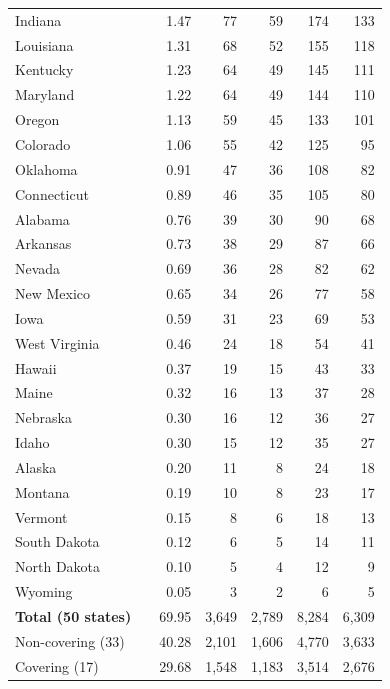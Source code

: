 \begin{landscape}
\begin{longtable}{@{} l l r r r r r @{}}
  Indiana &  & 1.47 & 77 & 59 & 174 & 133 \\
  Louisiana &  & 1.31 & 68 & 52 & 155 & 118 \\
  Kentucky &  & 1.23 & 64 & 49 & 145 & 111 \\
  Maryland &  & 1.22 & 64 & 49 & 144 & 110 \\
  Oregon &  & 1.13 & 59 & 45 & 133 & 101 \\
  Colorado &  & 1.06 & 55 & 42 & 125 & 95 \\
  Oklahoma &  & 0.91 & 47 & 36 & 108 & 82 \\
  Connecticut &  & 0.89 & 46 & 35 & 105 & 80 \\
  Alabama &  & 0.76 & 39 & 30 & 90 & 68 \\
  Arkansas &  & 0.73 & 38 & 29 & 87 & 66 \\
  Nevada &  & 0.69 & 36 & 28 & 82 & 62 \\
  New Mexico &  & 0.65 & 34 & 26 & 77 & 58 \\
  Iowa &  & 0.59 & 31 & 23 & 69 & 53 \\
  West Virginia &  & 0.46 & 24 & 18 & 54 & 41 \\
  Hawaii &  & 0.37 & 19 & 15 & 43 & 33 \\
  Maine &  & 0.32 & 16 & 13 & 37 & 28 \\
  Nebraska &  & 0.30 & 16 & 12 & 36 & 27 \\
  Idaho &  & 0.30 & 15 & 12 & 35 & 27 \\
  Alaska &  & 0.20 & 11 & 8 & 24 & 18 \\
  Montana &  & 0.19 & 10 & 8 & 23 & 17 \\
  Vermont &  & 0.15 & 8 & 6 & 18 & 13 \\
  South Dakota &  & 0.12 & 6 & 5 & 14 & 11 \\
  North Dakota &  & 0.10 & 5 & 4 & 12 & 9 \\
  Wyoming &  & 0.05 & 3 & 2 & 6 & 5 \\
\midrule
  \textbf{Total (50 states)} &  & 69.95 & 3,649 & 2,789 & 8,284 & 6,309 \\
  \quad Non-covering (33) &  & 40.28 & 2,101 & 1,606 & 4,770 & 3,633 \\
  \quad Covering (17) &  & 29.68 & 1,548 & 1,183 & 3,514 & 2,676 \\
\end{longtable}


\end{landscape}

